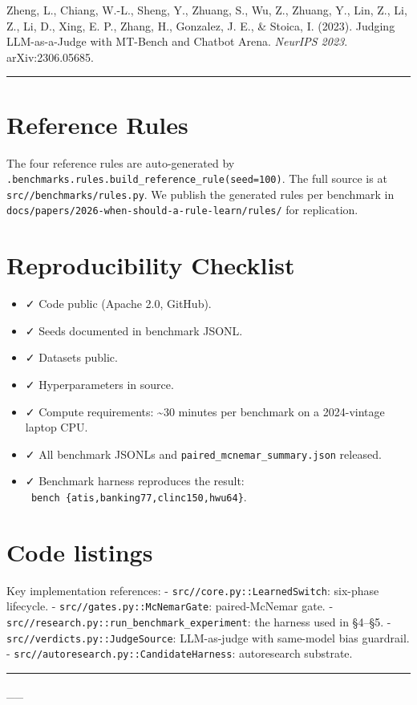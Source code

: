 Zheng, L., Chiang, W.-L., Sheng, Y., Zhuang, S., Wu, Z., Zhuang, Y.,
Lin, Z., Li, Z., Li, D., Xing, E. P., Zhang, H., Gonzalez, J. E., \&
Stoica, I. (2023). Judging LLM-as-a-Judge with MT-Bench and Chatbot
Arena. \emph{NeurIPS 2023}. arXiv:2306.05685.

\begin{center}\rule{0.5\linewidth}{0.5pt}\end{center}

\appendix

\section{Reference Rules}\label{reference-rules}

The four reference rules are auto-generated by
\texttt{\pkgname{}.benchmarks.rules.build\_reference\_rule(seed=100)}. The
full source is at \texttt{src/\pkgname{}/benchmarks/rules.py}. We publish
the generated rules per benchmark in
\texttt{docs/papers/2026-when-should-a-rule-learn/rules/} for
replication.

\section{Reproducibility Checklist}\label{reproducibility-checklist}

\begin{itemize}
\tightlist
\item
  ✓ Code public (Apache 2.0, GitHub).
\item
  ✓ Seeds documented in benchmark JSONL.
\item
  ✓ Datasets public.
\item
  ✓ Hyperparameters in source.
\item
  ✓ Compute requirements: \textasciitilde30 minutes per benchmark on a
  2024-vintage laptop CPU.
\item
  ✓ All benchmark JSONLs and \texttt{paired\_mcnemar\_summary.json}
  released.
\item
  ✓ Benchmark harness reproduces the result:
  \texttt{\pkgname{}\ bench\ \{atis,banking77,clinc150,hwu64\}}.
\end{itemize}

\section{Code listings}\label{code-listings}

Key implementation references: -
\texttt{src/\pkgname{}/core.py::LearnedSwitch}: six-phase lifecycle. -
\texttt{src/\pkgname{}/gates.py::McNemarGate}: paired-McNemar gate. -
\texttt{src/\pkgname{}/research.py::run\_benchmark\_experiment}: the
harness used in §4--§5. -
\texttt{src/\pkgname{}/verdicts.py::JudgeSource}: LLM-as-judge with
same-model bias guardrail. -
\texttt{src/\pkgname{}/autoresearch.py::CandidateHarness}: autoresearch
substrate.

\begin{center}\rule{0.5\linewidth}{0.5pt}\end{center}

\_\_
